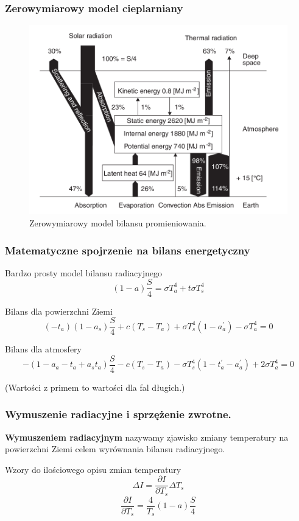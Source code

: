 \documentclass{beamer}
\begin{document}
\begin{frame}
	\frametitle{Zerowymiarowy model cieplarniany}
	\begin{figure}[h]
		\begin{center}
			\includegraphics[width=0.7\linewidth]{images/0D_Model.png}
			\caption{Zerowymiarowy model bilansu promieniowania.\cite{b2}}
		\end{center}
	\end{figure}

\end{frame}



\begin{frame}
	\frametitle{Matematyczne spojrzenie na bilans energetyczny}
	\begin{block}{Bardzo prosty model bilansu radiacyjnego}
		\[(1-a)\frac{S}{4} = \sigma T_a^4 + t\sigma T_s^4
		\]
	\end{block}
	\begin{block}{Bilans dla powierzchni Ziemi}
		\[(-t_a)(1-a_s)\frac{S}{4}+c(T_s - T_a)+\sigma T_s^4(1-a_a^{'})
		-\sigma T_a^4 =0
		\]
	\end{block}
	\begin{block}{Bilans dla atmosfery}
		\[-(1- a_a-t_a+a_st_a)\frac{S}{4} - c(T_s - T_a) - \sigma T_s^4
		(1-t_a^{'}-a_a^{'}) + 2\sigma T_a^4=0
		\]
	\end{block}
	\scriptsize{(Wartości z primem to wartości dla fal długich.)}
	
\end{frame}


\begin{frame}
	\frametitle{Wymuszenie radiacyjne i sprzężenie zwrotne.}
	\textbf{Wymuszeniem radiacyjnym} nazywamy zjawisko zmiany temperatury na powierzchni Ziemi celem wyrównania bilansu radiacyjnego. 
	\begin{block}{Wzory do ilościowego opisu zmian temperatury}
		\[\Delta I = \frac{\partial I}{\partial T_s}\Delta T_s
		\]
		\[\frac{\partial I}{\partial T_s} = \frac{4}{T_s}(1-a)\frac{S}{4}
		\]
		
	\end{block}
\end{frame}
\end{document}
